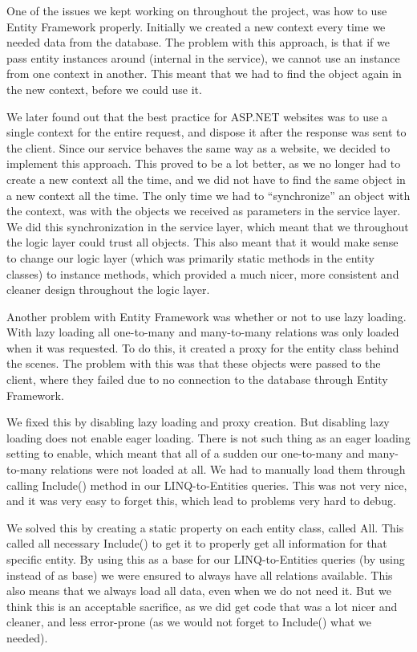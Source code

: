 One of the issues we kept working on throughout the project, was how to use Entity Framework properly. Initially we created a new context every time we needed data from the database. The problem with this approach, is that if we pass entity instances around (internal in the service), we cannot use an instance from one context in another. This meant that we had to find the object again in the new context, before we could use it.

We later found out that the best practice for ASP.NET websites was to use a single context for the entire request, and dispose it after the response was sent to the client. Since our service behaves the same way as a website, we decided to implement this approach. This proved to be a lot better, as we no longer had to create a new context all the time, and we did not have to find the same object in a new context all the time. The only time we had to ``synchronize'' an object with the context, was with the objects we received as parameters in the service layer. We did this synchronization in the service layer, which meant that we throughout the logic layer could trust all objects. This also meant that it would make sense to change our logic layer (which was primarily static methods in the entity classes) to instance methods, which provided a much nicer, more consistent and cleaner design throughout the logic layer.

Another problem with Entity Framework was whether or not to use lazy loading. With lazy loading all one-to-many and many-to-many relations was only loaded when it was requested. To do this, it created a proxy for the entity class behind the scenes. The problem with this was that these objects were passed to the client, where they failed due to no connection to the database through Entity Framework.

We fixed this by disabling lazy loading and proxy creation. But disabling lazy loading does not enable eager loading. There is not such thing as an eager loading setting to enable, which meant that all of a sudden our one-to-many and many-to-many relations were not loaded at all. We had to manually load them through calling Include() method in our LINQ-to-Entities queries. This was not very nice, and it was very easy to forget this, which lead to problems very hard to debug.

We solved this by creating a static property on each entity class, called All. This called all necessary Include() to get it to properly get all information for that specific entity. By using this as a base for our LINQ-to-Entities queries (by using  instead of  as base) we were ensured to always have all relations available. This also means that we always load all data, even when we do not need it. But we think this is an acceptable sacrifice, as we did get code that was a lot nicer and cleaner, and less error-prone (as we would not forget to Include() what we needed).

